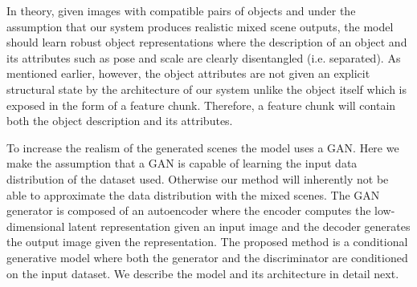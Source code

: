 \documentclass[12pt,a4paper]{article}
\begin{document}
In theory, given images with compatible pairs of objects and under the assumption that our system produces realistic mixed scene outputs, the model should learn robust object representations where the description of an object and its attributes such as pose and scale are clearly disentangled (i.e. separated). As mentioned earlier, however, the object attributes are not given an explicit structural state by the architecture of our system unlike the object itself which is exposed in the form of a feature chunk. Therefore, a feature chunk will contain both the object description and its attributes.

To increase the realism of the generated scenes the model uses a GAN. Here we make the assumption that a GAN is capable of learning the input data distribution of the dataset used. Otherwise our method will inherently not be able to approximate the data distribution with the mixed scenes. The GAN generator is composed of an autoencoder where the encoder computes the low-dimensional latent representation given an input image and the decoder generates the output image given the representation. The proposed method is a conditional generative model where both the generator and the discriminator are conditioned on the input dataset. We describe the model and its architecture in detail next.



\end{document}
